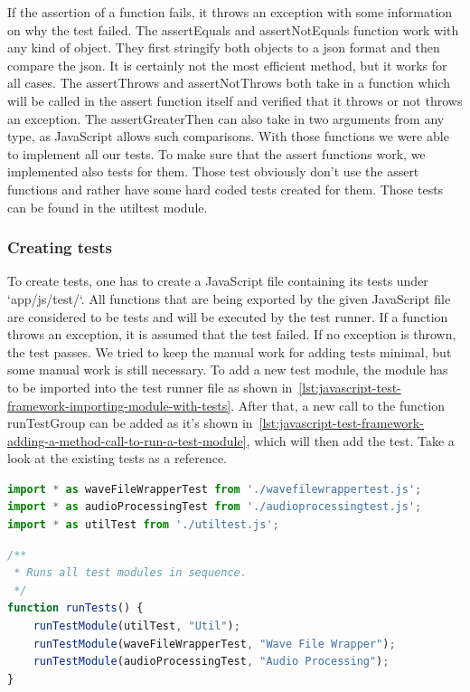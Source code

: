 If the assertion of a function fails, it throws an exception with some information on why the test failed.
The assertEquals and assertNotEquals function work with any kind of object.
They first stringify both objects to a json format and then compare the json.
It is certainly not the most efficient method, but it works for all cases.
The assertThrows and assertNotThrows both take in a function which will be called in the assert function itself and verified that it throws or not throws an exception.
The assertGreaterThen can also take in two arguments from any type, as JavaScript allows such comparisons.
With those functions we were able to implement all our tests.
To make sure that the assert functions work, we implemented also tests for them.
Those test obviously don't use the assert functions and rather have some hard coded tests created for them.
Those tests can be found in the utiltest module.

\subsubsection{Creating tests}
To create tests, one has to create a JavaScript file containing its tests under `app/js/test/`.
All functions that are being exported by the given JavaScript file are considered to be tests and will be executed by the test runner.
If a function throws an exception, it is assumed that the test failed.
If no exception is thrown, the test passes.
We tried to keep the manual work for adding tests minimal, but some manual work is still necessary.
To add a new test module, the module has to be imported into the test runner file as shown in~\ref{lst:javascript-test-framework-importing-module-with-tests}.
After that, a new call to the function runTestGroup can be added as it's shown in~\ref{lst:javascript-test-framework-adding-a-method-call-to-run-a-test-module}, which will then add the test.
Take a look at the existing tests as a reference.

\begin{lstlisting}[caption={Importing a module with tests},label={lst:javascript-test-framework-importing-module-with-tests},language=JavaScript]
import * as waveFileWrapperTest from './wavefilewrappertest.js';
import * as audioProcessingTest from './audioprocessingtest.js';
import * as utilTest from './utiltest.js';
\end{lstlisting}

\begin{lstlisting}[caption={Adding a method call to run a test module},label={lst:javascript-test-framework-adding-a-method-call-to-run-a-test-module},language=JavaScript]
/**
 * Runs all test modules in sequence.
 */
function runTests() {
    runTestModule(utilTest, "Util");
    runTestModule(waveFileWrapperTest, "Wave File Wrapper");
    runTestModule(audioProcessingTest, "Audio Processing");
}
\end{lstlisting}

